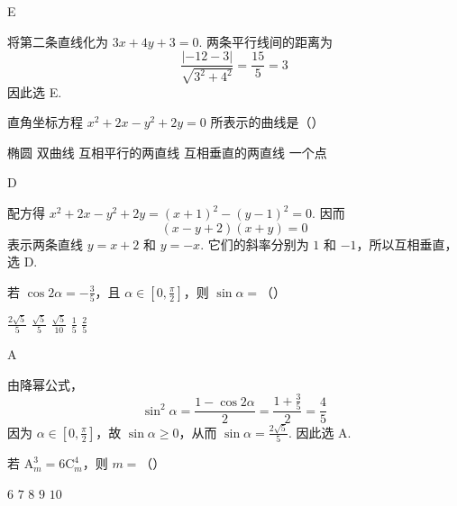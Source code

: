 \begin{answer}
E
\end{answer}

\begin{solution}
将第二条直线化为 \(3x+4y+3=0\). 两条平行线间的距离为
\[
\frac{|-12-3|}{\sqrt{3^2+4^2}}=\frac{15}{5}=3
\]
因此选 E.
\end{solution}


\begin{problem}

直角坐标方程 \(x^{2} + 2x - y^{2} + 2y = 0\) 所表示的曲线是（\quad）

\choicesfive
    {椭圆}
    {双曲线}
    {互相平行的两直线}
    {互相垂直的两直线}
    {一个点}
\end{problem}

\begin{answer}
D
\end{answer}

\begin{solution}
配方得 \(x^2+2x-y^2+2y=(x+1)^2-(y-1)^2=0\). 因而
\[
(x-y+2)(x+y)=0
\]
表示两条直线 \(y=x+2\) 和 \(y=-x\). 它们的斜率分别为 \(1\) 和 \(-1\)，所以互相垂直，选 D.
\end{solution}


\begin{problem}

若 \(\cos 2\alpha = -\frac{3}{5}\)，且 \(\alpha \in \left[0, \frac{\pi}{2}\right]\)，则 \(\sin \alpha =\)（\quad）

\choicesfive
    {\(\frac{2\sqrt{5}}{5}\)}
    {\(\frac{\sqrt{5}}{5}\)}
    {\(\frac{\sqrt{5}}{10}\)}
    {\(\frac{1}{5}\)}
    {\(\frac{2}{5}\)}
\end{problem}

\begin{answer}
A
\end{answer}

\begin{solution}
由降幂公式，
\[
\sin^2\alpha=\frac{1-\cos2\alpha}{2}=\frac{1+\frac{3}{5}}{2}=\frac{4}{5}
\]
因为 \(\alpha\in[0,\frac{\pi}{2}]\)，故 \(\sin\alpha\geq0\)，从而 \(\sin\alpha=\frac{2\sqrt{5}}{5}\). 因此选 A.
\end{solution}


\begin{problem}

若 \(\mathrm A_m^3 = 6\mathrm C_m^4\)，则 \(m =\)（\quad）

\choicesfive
    {\(6\)}
    {\(7\)}
    {\(8\)}
    {\(9\)}
    {\(10\)}
\end{problem}

